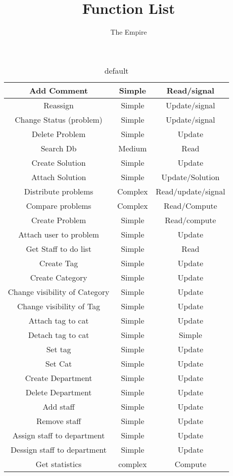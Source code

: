 \documentclass[11pt]{amsart}
\title{Function List}
\author{The Empire}
\begin{document}
\maketitle

\begin{table}[htdp]
\caption{default}
\begin{center}
\begin{tabular}{|c|c|c|}
\hline
Add Comment &   Simple & Read/signal   \\ \hline%
Reassign & Simple   & Update/signal \\ \hline%
Change Status (problem) &   Simple & Update/signal \\ \hline%
Delete Problem & Simple &   Update \\   \hline%
Search Db & Medium &   Read \\ \hline%
Create Solution & Simple &   Update \\   \hline%
Attach Solution & Simple &   Update/Solution \\   \hline%
Distribute problems &   Complex & Read/update/signal \\   \hline%
Compare problems & Complex & Read/Compute \\ \hline%
Create Problem &   Simple & Read/compute \\   \hline%
Attach user to problem & Simple & Update \\ \hline%
Get Staff to do list & Simple & Read \\   \hline%
Create Tag & Simple &   Update \\ \hline%
Create Category & Simple & Update \\ \hline%
Change visibility of Category &   Simple &   Update \\   \hline%
Change visibility of Tag &   Simple &  Update \\ \hline%
Attach tag to cat & Simple & Update \\ \hline%
Detach tag to cat & Simple & Simple \\ \hline%
Set tag & Simple & Update \\ \hline%
Set Cat & Simple & Update \\ \hline%
Create Department & Simple & Update \\ \hline%
Delete Department & Simple & Update \\ \hline%
Add staff & Simple & Update \\ \hline%
Remove staff & Simple & Update \\ \hline%
Assign staff to department & Simple & Update \\ \hline%
Dessign staff to department & Simple & Update \\ \hline%
Get statistics & complex & Compute \\ \hline%

\end{tabular}
\end{center}
\label{default}
\end{table}%
\end{document}
